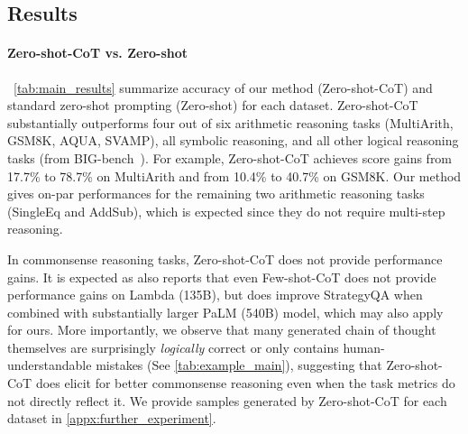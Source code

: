 \documentclass{article}
\newcommand{\ours}{Zero-shot-CoT\xspace}
\newcommand{\theirs}{Few-shot-CoT\xspace}
\newcommand{\theirsz}{Zero-shot\xspace}
\begin{document}
\subsection{Results}



\paragraph{\ours vs. \theirsz}

~\autoref{tab:main_results} summarize accuracy of our method (\ours) and standard zero-shot prompting (\theirsz) for each dataset. 
\ours substantially outperforms four out of six arithmetic reasoning tasks (MultiArith, GSM8K, AQUA, SVAMP), all symbolic reasoning, and all other logical reasoning tasks (from BIG-bench~\citep{bigbench}).
For example, \ours achieves score gains from 17.7\% to 78.7\% on MultiArith and from 10.4\% to 40.7\% on GSM8K. 
Our method gives on-par performances for the remaining two arithmetic reasoning tasks (SingleEq and AddSub), which is expected since they do not require multi-step reasoning. 

In commonsense reasoning tasks, \ours does not provide performance gains. 
It is expected as \citet{cot_wei} also reports that even \theirs does not provide performance gains on Lambda (135B), but does improve StrategyQA when combined with substantially larger PaLM (540B) model, which may also apply for ours. 
More importantly, we observe that many generated chain of thought themselves are surprisingly \textit{logically} correct or only contains human-understandable mistakes (See \autoref{tab:example_main}), suggesting that \ours does elicit for better commonsense reasoning even when the task metrics do not directly reflect it. 
We provide samples generated by \ours for each dataset in \autoref{appx:further_experiment}. 
\end{document}

